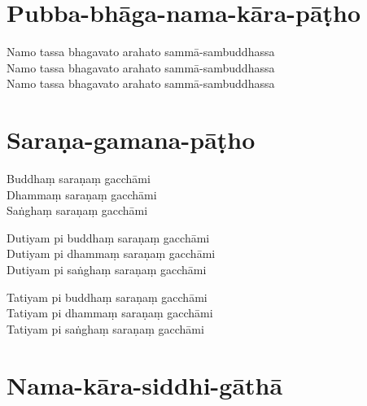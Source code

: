 
\section{Pubba-bhāga-nama-kāra-pāṭho}

Namo tassa bhagavato arahato sammā-sambuddhassa\\
Namo tassa bhagavato arahato sammā-sambuddhassa\\
Namo tassa bhagavato arahato sammā-sambuddhassa

\section{Saraṇa-gamana-pāṭho}

\begin{paritta}
Buddhaṃ saraṇaṃ gacchāmi\\
Dhammaṃ saraṇaṃ gacchāmi\\
Saṅghaṃ saraṇaṃ gacchāmi

Dutiyam pi buddhaṃ saraṇaṃ gacchāmi\\
Dutiyam pi dhammaṃ saraṇaṃ gacchāmi\\
Dutiyam pi saṅghaṃ saraṇaṃ gacchāmi

Tatiyam pi buddhaṃ saraṇaṃ gacchāmi\\
Tatiyam pi dhammaṃ saraṇaṃ gacchāmi\\
Tatiyam pi saṅghaṃ saraṇaṃ gacchāmi
\end{paritta}

\enlargethispage{\baselineskip}

\section{Nama-kāra-siddhi-gāthā}


